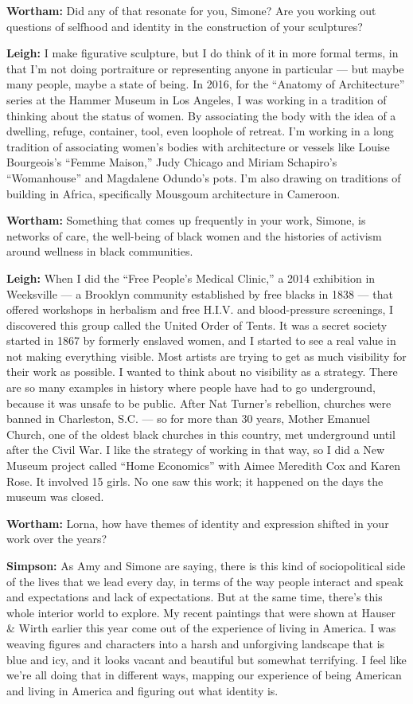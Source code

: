 \textbf{Wortham:} Did any of that resonate for you, Simone? Are you
working out questions of selfhood and identity in the construction of
your sculptures?

\textbf{Leigh:} I make figurative sculpture, but I do think of it in
more formal terms, in that I'm not doing portraiture or representing
anyone in particular --- but maybe many people, maybe a state of being.
In 2016, for the ``Anatomy of Architecture'' series at the Hammer Museum
in Los Angeles, I was working in a tradition of thinking about the
status of women. By associating the body with the idea of a dwelling,
refuge, container, tool, even loophole of retreat. I'm working in a long
tradition of associating women's bodies with architecture or vessels
like Louise Bourgeois's ``Femme Maison,'' Judy Chicago and Miriam
Schapiro's ``Womanhouse'' and Magdalene Odundo's pots. I'm also drawing
on traditions of building in Africa, specifically Mousgoum architecture
in Cameroon.

\textbf{Wortham:} Something that comes up frequently in your work,
Simone, is networks of care, the well-being of black women and the
histories of activism around wellness in black communities.

\textbf{Leigh:} When I did the ``Free People's Medical Clinic,'' a 2014
exhibition in Weeksville --- a Brooklyn community established by free
blacks in 1838 --- that offered workshops in herbalism and free H.I.V.
and blood-pressure screenings, I discovered this group called the United
Order of Tents. It was a secret society started in 1867 by formerly
enslaved women, and I started to see a real value in not making
everything visible. Most artists are trying to get as much visibility
for their work as possible. I wanted to think about no visibility as a
strategy. There are so many examples in history where people have had to
go underground, because it was unsafe to be public. After Nat Turner's
rebellion, churches were banned in Charleston, S.C. --- so for more than
30 years, Mother Emanuel Church, one of the oldest black churches in
this country, met underground until after the Civil War. I like the
strategy of working in that way, so I did a New Museum project called
``Home Economics'' with Aimee Meredith Cox and Karen Rose. It involved
15 girls. No one saw this work; it happened on the days the museum was
closed.

\textbf{Wortham:} Lorna, how have themes of identity and expression
shifted in your work over the years?

\textbf{Simpson:} As Amy and Simone are saying, there is this kind of
sociopolitical side of the lives that we lead every day, in terms of the
way people interact and speak and expectations and lack of expectations.
But at the same time, there's this whole interior world to explore. My
recent paintings that were shown at Hauser \& Wirth earlier this year
come out of the experience of living in America. I was weaving figures
and characters into a harsh and unforgiving landscape that is blue and
icy, and it looks vacant and beautiful but somewhat terrifying. I feel
like we're all doing that in different ways, mapping our experience of
being American and living in America and figuring out what identity is.

